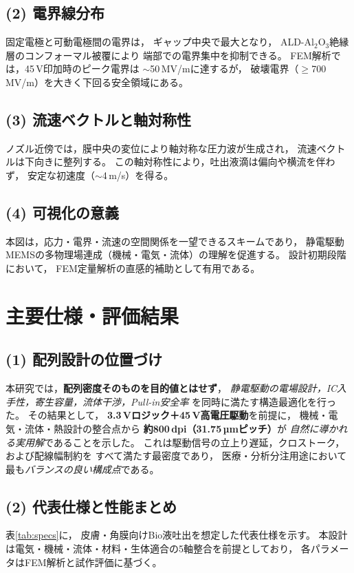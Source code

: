 \documentclass[conference]{IEEEtran}
\begin{document}
\subsection*{(2) 電界線分布}
固定電極と可動電極間の電界は，
ギャップ中央で最大となり，
ALD-Al$_2$O$_3$絶縁層のコンフォーマル被覆により
端部での電界集中を抑制できる。
FEM解析では，45\,V印加時のピーク電界は
$\sim$50\,MV/mに達するが，
破壊電界（$\ge$700\,MV/m）を大きく下回る安全領域にある。

\subsection*{(3) 流速ベクトルと軸対称性}
ノズル近傍では，膜中央の変位により軸対称な圧力波が生成され，
流速ベクトルは下向きに整列する。
この軸対称性により，吐出液滴は偏向や横流を伴わず，
安定な初速度（$\sim$4\,m/s）を得る。

\subsection*{(4) 可視化の意義}
本図は，応力・電界・流速の空間関係を一望できるスキームであり，
静電駆動MEMSの多物理場連成（機械・電気・流体）の理解を促進する。
設計初期段階において，
FEM定量解析の直感的補助として有用である。

\section{主要仕様・評価結果}

\subsection*{(1) 配列設計の位置づけ}
本研究では，\textbf{配列密度そのものを目的値とはせず}，
\emph{静電駆動の電場設計，IC入手性，寄生容量，流体干渉，Pull-in安全率}
を同時に満たす構造最適化を行った。
その結果として，
\textbf{3.3\,Vロジック＋45\,V高電圧駆動}を前提に，
機械・電気・流体・熱設計の整合点から
\textbf{約800\,dpi（31.75\,µmピッチ）}が
\emph{自然に導かれる実用解}であることを示した。
これは駆動信号の立上り遅延，クロストーク，および配線幅制約を
すべて満たす最密度であり，
医療・分析分注用途において最も\emph{バランスの良い構成点}である。

\subsection*{(2) 代表仕様と性能まとめ}
表\ref{tab:specs}に，
皮膚・角膜向けBio液吐出を想定した代表仕様を示す。
本設計は電気・機械・流体・材料・生体適合の5軸整合を前提としており，
各パラメータはFEM解析と試作評価に基づく。
\end{document}
